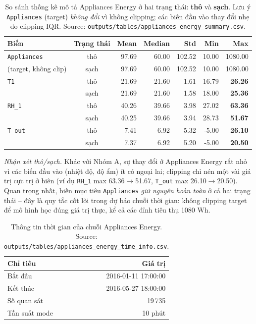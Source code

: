 \begin{table}[H]
\centering
\caption[Thống kê thô/sạch Appliances Energy]{So sánh thống kê mô tả Appliances Energy ở hai trạng thái: \textbf{thô} và \textbf{sạch}. Lưu ý \texttt{Appliances} (target) \emph{không đổi} vì không clipping; các biến đầu vào thay đổi nhẹ do clipping IQR. Source: \texttt{outputs/tables/appliances\_energy\_summary.csv}.}
\label{tab:ch4_appliances_stats_raw_clean}
\footnotesize
\setlength{\tabcolsep}{4pt}
\begin{tabular}{lcrrrrr}
\toprule
Biến & Trạng thái & Mean & Median & Std & Min & \textbf{Max} \\
\midrule
\texttt{Appliances} & thô & 97.69 & 60.00 & 102.52 & 10.00 & 1080.00 \\
 (target, không clip) & sạch & 97.69 & 60.00 & 102.52 & 10.00 & 1080.00 \\
\midrule
\texttt{T1} & thô & 21.69 & 21.60 & 1.61 & 16.79 & \textbf{26.26} \\
 & sạch & 21.69 & 21.60 & 1.58 & 18.00 & \textbf{25.36} \\
\midrule
\texttt{RH\_1} & thô & 40.26 & 39.66 & 3.98 & 27.02 & \textbf{63.36} \\
 & sạch & 40.25 & 39.66 & 3.94 & 28.73 & \textbf{51.67} \\
\midrule
\texttt{T\_out} & thô & 7.41 & 6.92 & 5.32 & -5.00 & \textbf{26.10} \\
 & sạch & 7.37 & 6.92 & 5.20 & -5.00 & \textbf{20.50} \\
\bottomrule
\end{tabular}
\end{table}

\textit{Nhận xét thô/sạch.} Khác với Nhóm A, sự thay đổi ở Appliances Energy rất nhỏ vì các biến đầu vào (nhiệt độ, độ ẩm) ít có ngoại lai; clipping chỉ nén một vài giá trị cực trị ở biên (ví dụ \texttt{RH\_1} max 63.36$\to$51.67, \texttt{T\_out} max 26.10$\to$20.50). Quan trọng nhất, biến mục tiêu \texttt{Appliances} \emph{giữ nguyên hoàn toàn} ở cả hai trạng thái -- đây là quy tắc cốt lõi trong dự báo chuỗi thời gian: không clipping target để mô hình học đúng giá trị thực, kể cả các đỉnh tiêu thụ 1080 Wh.

\begin{table}[H]
\centering
\caption[Thông tin thời gian Appliances Energy]{Thông tin thời gian của chuỗi Appliances Energy. Source: \texttt{outputs/tables/appliances\_energy\_time\_info.csv}.}
\label{tab:ch4_appliances_time_info}
\small
\begin{tabular}{lr}
\toprule
Chỉ tiêu & Giá trị \\
\midrule
Bắt đầu & 2016-01-11 17:00:00 \\
Kết thúc & 2016-05-27 18:00:00 \\
Số quan sát & 19\,735 \\
Tần suất mode & 10 phút \\
\bottomrule
\end{tabular}
\end{table}

